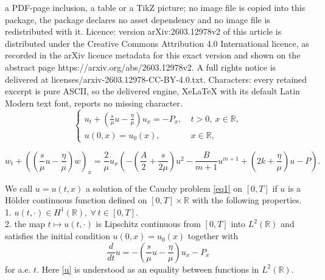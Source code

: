 \documentclass[10pt,a4paper]{amsart}
\begin{document}
a PDF-page inclusion, a table or a TikZ picture; no image file is copied into this package, the package declares no asset dependency and no image file is redistributed with it. Licence: version arXiv:2603.12978v2 of this article is distributed under the Creative Commons Attribution 4.0 International licence, as recorded in the arXiv licence metadata for this exact version and shown on the abstract page https://arxiv.org/abs/2603.12978v2. A full rights notice is delivered at licenses/arxiv-2603.12978-CC-BY-4.0.txt. Characters: every retained excerpt is pure ASCII, so the delivered engine, XeLaTeX with its default Latin Modern text font, reports no missing character.
	\begin{equation}\label{eq1}
		\left\{
		\begin{array}{ll}
			u_t+\left(\frac{s}{\mu}u-\frac{\eta}{\mu}\right)u_x
			=-P_x,\ &t>0,\ x\in\mathbb{R}, \\
			u(0,x)=u_0(x), &x\in\mathbb{R},
		\end{array}\right.
	\end{equation}

	\begin{equation}\label{eqw}
		w_t+\left(\left(\frac{s}{\mu}u-\frac{\eta}{\mu}\right)w\right)_x=\frac{2}{\mu}u_x\left(-\left(\frac A2+\frac{s}{2\mu}\right)u^2-\frac{B}{m+1}u^{m+1}+\left(2k+\frac{\eta}{\mu}\right)u-P\right).
	\end{equation}

	\begin{defi}\label{solution}
		We call $u=u(t,x)$ a solution of the Cauchy problem \eqref{eq1} on $[0,T]$ if $u$ is a H\"{o}lder continuous function defined on $[0,T]\times\mathbb{R}$ with the following properties. \\
		1. $u(t,\cdot)\in H^1(\mathbb{R}),\ \forall\ t\in[0,T]$.\\
		2. the map $t\mapsto u(t,\cdot)$ is Lipschitz continuous from $[0,T]$ into $L^2(\mathbb{R})$ and satisfies the initial condition $u(0,x)=u_0(x)$ together with
		\begin{equation}\label{u}
			\frac{d}{dt}u=-\left(\frac{s}{\mu}u-\frac{\eta}{\mu}\right)u_x-P_x
		\end{equation}
		for a.e. $t$. Here \eqref{u} is understood as an equality between functions in $L^2(\mathbb{R})$.
	\end{defi}
\end{document}
